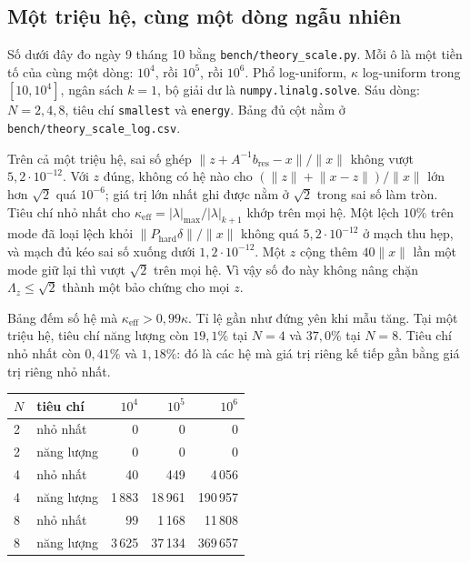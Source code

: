 \documentclass[11pt,a4paper]{article}
\newenvironment{revisedblock}{\par\color{revised}\ignorespaces}{\par}
\begin{document}
\begin{revisedblock}
\subsection{Một triệu hệ, cùng một dòng ngẫu nhiên}
\label{sec:million}
Số dưới đây đo ngày 9 tháng 10 bằng \texttt{bench/theory\_scale.py}.
Mỗi ô là một tiền tố của cùng một dòng: \(10^{4}\), rồi \(10^{5}\), rồi \(10^{6}\).
Phổ log-uniform, \(\kappa\) log-uniform trong \([10,10^{4}]\), ngân sách \(k=1\), bộ giải dư là \texttt{numpy.linalg.solve}.
Sáu dòng: \(N=2,4,8\), tiêu chí \texttt{smallest} và \texttt{energy}.
Bảng đủ cột nằm ở \texttt{bench/theory\_scale\_log.csv}.

Trên cả một triệu hệ, sai số ghép \(\lVert z+A^{-1}b_{\mathrm{res}}-x\rVert/\lVert x\rVert\) không vượt \(5{,}2\cdot 10^{-12}\).
Với \(z\) đúng, không có hệ nào cho \((\lVert z\rVert+\lVert x-z\rVert)/\lVert x\rVert\) lớn hơn \(\sqrt{2}\) quá \(10^{-6}\); giá trị lớn nhất ghi được nằm ở \(\sqrt{2}\) trong sai số làm tròn.
Tiêu chí nhỏ nhất cho \(\kappa_{\mathrm{eff}}=\lvert\lambda\rvert_{\max}/\lvert\lambda\rvert_{k+1}\) khớp trên mọi hệ.
Một lệch \(10\%\) trên mode đã loại lệch khỏi \(\lVert P_{\mathrm{hard}}\delta\rVert/\lVert x\rVert\) không quá \(5{,}2\cdot 10^{-12}\) ở mạch thu hẹp, và mạch đủ kéo sai số xuống dưới \(1{,}2\cdot 10^{-12}\).
Một \(z\) cộng thêm \(40\lVert x\rVert\) lần một mode giữ lại thì vượt \(\sqrt{2}\) trên mọi hệ.
Vì vậy số đo này không nâng chặn \(\Lambda_z\le\sqrt{2}\) thành một bảo chứng cho mọi \(z\).

Bảng đếm số hệ mà \(\kappa_{\mathrm{eff}}>0{,}99\kappa\).
Tỉ lệ gần như đứng yên khi mẫu tăng.
Tại một triệu hệ, tiêu chí năng lượng còn \(19{,}1\%\) tại \(N=4\) và \(37{,}0\%\) tại \(N=8\).
Tiêu chí nhỏ nhất còn \(0{,}41\%\) và \(1{,}18\%\): đó là các hệ mà giá trị riêng kế tiếp gần bằng giá trị riêng nhỏ nhất.

\begin{center}
\color{revised}
\begin{tabular}{@{}llrrr@{}}
\toprule
\(N\) & tiêu chí & \(10^{4}\) & \(10^{5}\) & \(10^{6}\) \\
\midrule
2 & nhỏ nhất & 0 & 0 & 0 \\
2 & năng lượng & 0 & 0 & 0 \\
4 & nhỏ nhất & 40 & 449 & 4\,056 \\
4 & năng lượng & 1\,883 & 18\,961 & 190\,957 \\
8 & nhỏ nhất & 99 & 1\,168 & 11\,808 \\
8 & năng lượng & 3\,625 & 37\,134 & 369\,657 \\
\bottomrule
\end{tabular}
\end{center}
\end{revisedblock}
\end{document}
